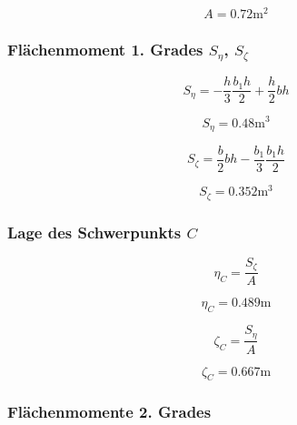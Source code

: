 \documentclass[
  12pt,
  letterpaper,
  DIV=11,
  egregdoesnotlikesansseriftitles]{scrartcl}
\begin{document}
\begin{equation}A = 0.72 \text{m}^{2}\end{equation}

\hypertarget{fluxe4chenmoment-1.-grades-s_eta-s_zeta}{%
\subsubsection{\texorpdfstring{Flächenmoment 1. Grades \(S_\eta\),
\(S_\zeta\)}{Flächenmoment 1. Grades S\_\textbackslash eta, S\_\textbackslash zeta}}\label{fluxe4chenmoment-1.-grades-s_eta-s_zeta}}

\begin{equation}S_{\eta} = - \frac{h}{3} \frac{b_{1} h}{2} + \frac{h}{2} b h\end{equation}

\begin{equation}S_{\eta} = 0.48 \text{m}^{3}\end{equation}

\begin{equation}S_{\zeta} = \frac{b}{2} b h - \frac{b_{1}}{3} \frac{b_{1} h}{2}\end{equation}

\begin{equation}S_{\zeta} = 0.352 \text{m}^{3}\end{equation}

\hypertarget{lage-des-schwerpunkts-c}{%
\subsubsection{\texorpdfstring{Lage des Schwerpunkts
\(C\)}{Lage des Schwerpunkts C}}\label{lage-des-schwerpunkts-c}}

\begin{equation}\eta_{C} = \frac{S_{\zeta}}{A}\end{equation}

\begin{equation}\eta_{C} = 0.489 \text{m}\end{equation}

\begin{equation}\zeta_{C} = \frac{S_{\eta}}{A}\end{equation}

\begin{equation}\zeta_{C} = 0.667 \text{m}\end{equation}

\hypertarget{fluxe4chenmomente-2.-grades}{%
\subsubsection{Flächenmomente 2.
Grades}\label{fluxe4chenmomente-2.-grades}}
\end{document}
